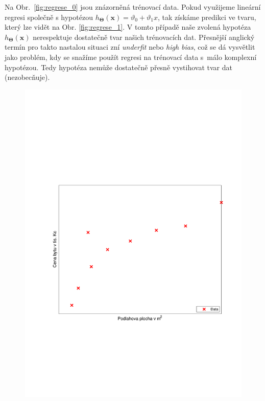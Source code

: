 \par{Na Obr.~\ref{fig:regrese_0} jsou znázorněná trénovací data. Pokud využijeme lineární regresi společně s hypotézou $h_{\bm{\Theta}} \left( \bm{x} \right) = \vartheta_0 + \vartheta_1 x$, tak získáme predikci ve tvaru, který lze vidět na Obr. \ref{fig:regrese_1}. V tomto případě naše zvolená hypotéza $h_{\bm{\Theta}} \left( \bm{x} \right)$ nerespektuje dostatečně tvar našich trénovacích dat. Přesnější anglický termín pro takto nastalou situaci zní \textit{underfit} nebo \textit{high bias}, což se dá vysvětlit jako problém, kdy se snažíme použít regresi na trénovací data s~málo komplexní hypotézou. Tedy hypotéza nemůže dostatečně přesně vystihovat tvar dat (nezobecňuje).}
\begin{figure}[!ht]
	\centering
	\begin{minipage}[t]{0.48\textwidth}
		\includegraphics[width = \textwidth, trim = 2.5cm 7cm 2cm 9cm]{./Img/Regularizace/Pretrenovani1D/regrese_0.pdf}

\end{minipage}
\end{figure}
